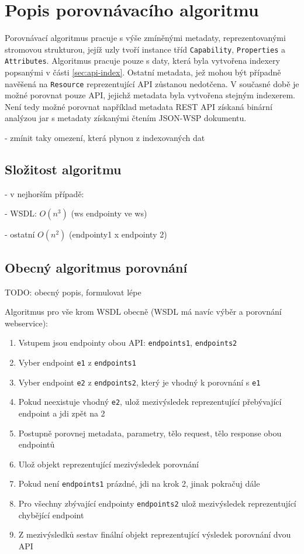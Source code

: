 \documentclass[czech,DP]{thesiskiv}
\begin{document}
\section{Popis porovnávacího algoritmu}

Porovnávací algoritmus pracuje s výše zmíněnými metadaty, reprezentovanými stromovou strukturou, jejíž uzly tvoří instance tříd \verb|Capability|, \verb|Properties| a \verb|Attributes|. Algoritmus pracuje pouze s daty, která byla vytvořena indexery popsanými v části \ref{sec:api-index}. Ostatní metadata, jež mohou být případně navěšená na \verb|Resource| reprezentující API zůstanou nedotčena. V současné době je možné porovnat pouze API, jejichž metadata byla vytvořena stejným indexerem. Není tedy možné porovnat například metadata REST API získaná binární analýzou jar s metadaty získanými čtením JSON-WSP dokumentu.

- zmínit taky omezení, která plynou z indexovaných dat

\subsection{Složitost algoritmu}

- v nejhorším případě:

	- WSDL: $O(n^3)$ (ws endpointy ve ws)
	
	- ostatní $O(n^2)$ (endpointy1 x endpointy 2)

\subsection{Obecný algoritmus porovnání}

TODO: obecný popis, formulovat lépe

Algoritmus pro vše krom WSDL obecně (WSDL má navíc výběr a porovnání webservice):
\begin{enumerate}
	\item Vstupem jsou endpointy obou API: \verb|endpoints1|, \verb|endpoints2|
	\item Vyber endpoint \verb|e1| z \verb|endpoints1|
	\item Vyber endpoint \verb|e2| z \verb|endpoints2|, který je vhodný k porovnání s \verb|e1|
	\item Pokud neexistuje vhodný \verb|e2|, ulož mezivýsledek reprezentující přebývající endpoint a jdi zpět na 2
	\item Postupně porovnej metadata, parametry, tělo request, tělo response obou endpointů
	\item Ulož objekt reprezentující mezivýsledek porovnání
	\item Pokud není \verb|endpoints1| prázdné, jdi na krok 2, jinak pokračuj dále
	\item Pro všechny zbývající endpointy \verb|endpoints2| ulož mezivýsledek reprezentující chybějící endpoint
	\item Z mezivýsledků sestav finální objekt reprezentující výsledek porovnání dvou API
\end{enumerate}
\end{document}
